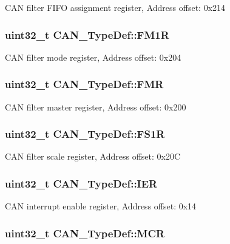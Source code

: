 C\-A\-N filter F\-I\-F\-O assignment register, Address offset\-: 0x214 \hypertarget{struct_c_a_n___type_def_aefe6a26ee25947b7eb5be9d485f4d3b0}{
\subsubsection[{F\-M1\-R}]{ uint32\-\_\-t C\-A\-N\-\_\-\-Type\-Def\-::\-F\-M1\-R}}\label{struct_c_a_n___type_def_aefe6a26ee25947b7eb5be9d485f4d3b0}
C\-A\-N filter mode register, Address offset\-: 0x204 \hypertarget{struct_c_a_n___type_def_a1a6a0f78ca703a63bb0a6b6f231f612f}{
\subsubsection[{F\-M\-R}]{ uint32\-\_\-t C\-A\-N\-\_\-\-Type\-Def\-::\-F\-M\-R}}\label{struct_c_a_n___type_def_a1a6a0f78ca703a63bb0a6b6f231f612f}
C\-A\-N filter master register, Address offset\-: 0x200 \hypertarget{struct_c_a_n___type_def_ac6296402924b37966c67ccf14a381976}{
\subsubsection[{F\-S1\-R}]{ uint32\-\_\-t C\-A\-N\-\_\-\-Type\-Def\-::\-F\-S1\-R}}\label{struct_c_a_n___type_def_ac6296402924b37966c67ccf14a381976}
C\-A\-N filter scale register, Address offset\-: 0x20\-C \hypertarget{struct_c_a_n___type_def_a530babbc4b9584c93a1bf87d6ce8b8dc}{
\subsubsection[{I\-E\-R}]{ uint32\-\_\-t C\-A\-N\-\_\-\-Type\-Def\-::\-I\-E\-R}}\label{struct_c_a_n___type_def_a530babbc4b9584c93a1bf87d6ce8b8dc}
C\-A\-N interrupt enable register, Address offset\-: 0x14 \hypertarget{struct_c_a_n___type_def_a1282eee79a22003257a7a5daa7f4a35f}{
\subsubsection[{M\-C\-R}]{ uint32\-\_\-t C\-A\-N\-\_\-\-Type\-Def\-::\-M\-C\-R}}\label{struct_c_a_n___type_def_a1282eee79a22003257a7a5daa7f4a35f}
